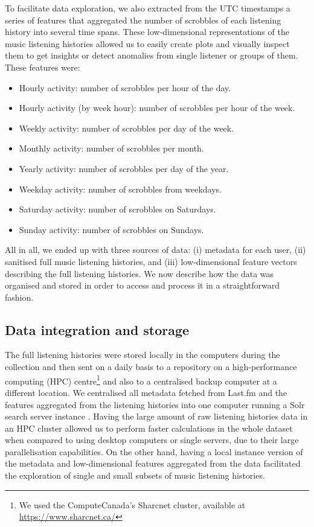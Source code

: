 To facilitate data exploration, we also extracted from the UTC timestamps a series of features that aggregated the number of scrobbles of each listening history into several time spans. These low-dimensional representations of the music listening histories allowed us to easily create plots and visually inspect them to get insights or detect anomalies from single listener or groups of them. These features were:
\begin{itemize}
\item Hourly activity: number of scrobbles per hour of the day.%
\item Hourly activity (by week hour): number of scrobbles per hour of the week.%
\item Weekly activity: number of scrobbles per day of the week.%
\item Monthly activity: number of scrobbles per month.%
\item Yearly activity: number of scrobbles per day of the year.%
\item Weekday activity: number of scrobbles from weekdays.%
\item Saturday activity: number of scrobbles on Saturdays.%
\item Sunday activity: number of scrobbles on Sundays.%
\end{itemize}

All in all, we ended up with three sources of data: (i) metadata for each user, (ii) sanitised full music listening histories, and (iii) low-dimensional feature vectors describing the full listening histories. 
We now describe how the data was organised and stored in order to access and process it in a straightforward fashion.



\subsection{Data integration and storage}
The full listening histories were stored locally in the computers during the collection and then sent on a daily basis to a repository on a high-performance computing (HPC) centre\footnote{We used the ComputeCanada's Sharcnet cluster, available at \url{https://www.sharcnet.ca/}} and also to a centralised backup computer at a different location.
We centralised all metadata fetched from Last.fm and the features aggregated from the listening histories into one computer running a Solr search server instance \autocite{shahi15apache}.
Having the large amount of raw listening histories data in an HPC cluster allowed us to perform faster calculations in the whole dataset when compared to using desktop computers or single servers, due to their large parallelisation capabilities. On the other hand, having a local instance version of the metadata and low-dimensional features aggregated from the data facilitated the exploration of single and small subsets of music listening histories.


